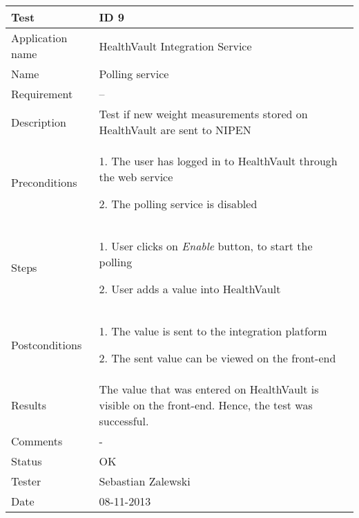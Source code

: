 \begin{table}
\begin{center}
\begin{tabular}{ | l | p{10cm} | }
	\hline
	\textbf{Test}	&	\textbf{ID 9} \\
	\hline\noalign{\smallskip}\noalign{\smallskip}\hline
	Application name	& HealthVault Integration Service \\
	Name				& Polling service \\
	Requirement			& -- \\
	Description			& Test if new weight measurements stored on HealthVault are sent to NIPEN \\
	Preconditions		&	\par 1. The user has logged in to HealthVault through the web service
							\par 2. The polling service is disabled \\
	Steps 				&	\par 1. User clicks on \textit{Enable} button, to start the polling 
							\par 2. User adds a value into HealthVault \\
	Postconditions		&	\par 1. The value is sent to the integration platform
							\par 2. The sent value can be viewed on the front-end \\
	Results				& The value that was entered on HealthVault is visible on the front-end.
						  Hence, the test was successful. \\
	Comments			& - \\
	Status				& OK \\
	Tester				& Sebastian Zalewski \\
	Date				& 08-11-2013 \\
	\hline
\end{tabular}
\end{center}
\end{table}